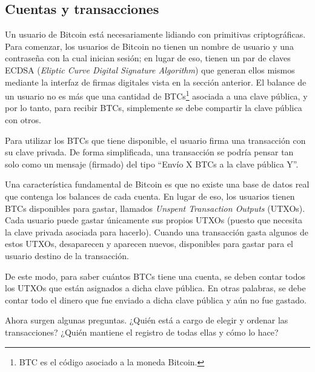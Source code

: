 \subsection{Cuentas y transacciones}

Un usuario de Bitcoin está necesariamente lidiando con primitivas criptográficas.
%
Para comenzar, los usuarios de Bitcoin no tienen un nombre de usuario y una contraseña
con la cual inician sesión; en lugar de eso, tienen un par de claves ECDSA (\textit{Eliptic
Curve Digital Signature Algorithm}) que generan ellos mismos mediante la interfaz de firmas
digitales vista en la sección anterior.
%
El balance de un usuario no es más que una cantidad de BTCs\footnote{BTC es el código asociado a la moneda Bitcoin.} asociada a una clave pública,
y por lo tanto, para recibir BTCs, simplemente se debe compartir la clave pública con otros.

%
Para utilizar los BTCs que tiene disponible, el usuario firma una transacción con su clave privada.
%
De forma simplificada, una transacción se podría pensar tan solo como un mensaje (firmado) del tipo
\textquotedblleft Envío X BTCs a la clave pública Y\textquotedblright.

Una característica fundamental de Bitcoin es que no existe una base de datos real que contenga los
balances de cada cuenta.
%
En lugar de eso, los usuarios tienen BTCs disponibles para gastar, llamados
\textit{Unspent Transaction Outputs} (UTXOs).
%
Cada usuario puede gastar únicamente sus propios UTXOs
(puesto que necesita la clave privada asociada para hacerlo).
%
Cuando una transacción gasta algunos de estos UTXOs, desaparecen y aparecen nuevos,
disponibles para gastar para el usuario destino de la transacción.
%

De este modo, para saber cuántos BTCs tiene una cuenta, se deben contar todos los UTXOs que están
asignados a dicha clave pública.
%
En otras palabras, se debe contar todo el dinero que fue enviado a dicha clave pública y aún no
fue gastado.

Ahora surgen algunas preguntas. ¿Quién está a cargo de elegir y ordenar las transacciones?
¿Quién mantiene el registro de todas ellas y cómo lo hace?

